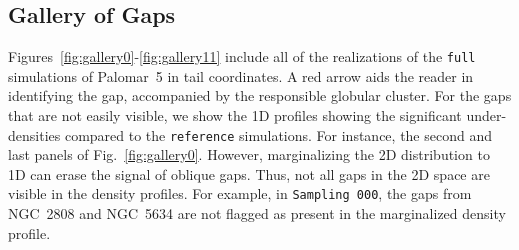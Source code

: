 \documentclass{aa}
\begin{document}
\begin{appendix}
  \section{Gallery of Gaps} \label{sec:gallery_of_gaps}
    Figures~\ref{fig:gallery0}-\ref{fig:gallery11} include all of the realizations of the \texttt{full} simulations of Palomar~5 in tail coordinates. A red arrow aids the reader in identifying the gap, accompanied by the responsible globular cluster. For the gaps that are not easily visible, we show the 1D profiles showing the significant under-densities compared to the \texttt{reference} simulations. For instance, the second and last panels of Fig.~\ref{fig:gallery0}. However, marginalizing the 2D distribution to 1D can erase the signal of oblique gaps. Thus, not all gaps in the 2D space are visible in the density profiles. For example, in \texttt{Sampling 000}, the gaps from NGC~2808 and NGC~5634 are not flagged as present in the marginalized density profile.


\end{appendix}
\end{document}
